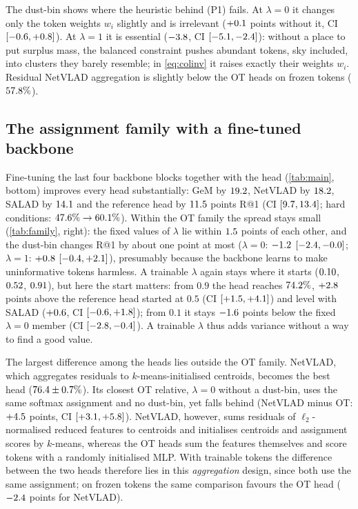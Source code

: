 The dust-bin shows where the heuristic behind (P1) fails. At $\lambda=0$ it changes only the token
weights $w_i$ slightly and is irrelevant ($+0.1$ points without it, CI
$[-0.6,+0.8]$). At $\lambda=1$ it is essential ($-3.8$, CI
$[-5.1,-2.4]$): without a place to put surplus mass, the balanced constraint
pushes abundant tokens, sky included, into clusters they barely resemble; in \eqref{eq:colinv} it
raises exactly their weights $w_i$. Residual NetVLAD aggregation is slightly
below the OT heads on frozen tokens ($57.8\%$).

\subsection{The assignment family with a fine-tuned backbone}\label{sec:ft}
Fine-tuning the last four backbone blocks together with the head (\cref{tab:main}, bottom) improves
every head substantially: GeM by $19.2$, NetVLAD by $18.2$, SALAD by $14.1$ and the
reference head by $11.5$ points R@1 (CI $[9.7,13.4]$; hard conditions:
$47.6\%\to60.1\%$). Within the OT family the spread stays small (\cref{tab:family},
right): the fixed values of $\lambda$ lie within $1.5$ points of each other, and the dust-bin changes R@1 by about one point at most
($\lambda=0$: $-1.2$ $[-2.4,-0.0]$; $\lambda=1$:
$+0.8$ $[-0.4,+2.1]$), presumably because the backbone learns to
make uninformative tokens harmless. A trainable $\lambda$ again stays where it starts ($0.10$,
$0.52$, $0.91$), but here the start matters: from $0.9$ the head reaches $74.2\%$,
$+2.8$ points above the reference head started at $0.5$ (CI
$[+1.5,+4.1]$) and level with SALAD ($+0.6$, CI
$[-0.6,+1.8]$); from $0.1$ it stays $-1.6$ points below
the fixed $\lambda=0$ member (CI $[-2.8,-0.4]$). A trainable $\lambda$ thus adds variance
without a way to find a good value.

The largest difference among the heads lies outside the OT family. NetVLAD, which aggregates residuals to
$k$-means-initialised centroids, becomes the best head ($76.4\pm0.7\%$). Its closest
OT relative, $\lambda=0$ without a dust-bin, uses the same softmax assignment and no dust-bin, yet
falls behind (NetVLAD minus OT: $+4.5$ points, CI $[+3.1,+5.8]$).
NetVLAD, however, sums residuals of $\ell_2$-normalised reduced features to centroids and initialises
centroids and assignment scores by $k$-means, whereas the OT heads sum the features themselves and
score tokens with a randomly initialised MLP. With trainable tokens the difference between the two heads therefore lies in this
\emph{aggregation} design, since both use the same assignment; on frozen tokens the same
comparison favours the OT head ($-2.4$ points for NetVLAD).
